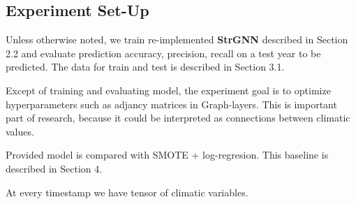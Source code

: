 \documentclass{article}
\begin{document}
\subsection{Experiment Set-Up}
Unless otherwise noted, we train re-implemented \textbf{StrGNN} described in Section 2.2 and evaluate prediction accuracy, precision, recall on a test year to be predicted. The data for train and test is described in Section 3.1.

Except of training and evaluating model, the experiment goal is to optimize hyperparameters such as adjancy matrices in Graph-layers. This is important part of research, because it could be interpreted as connections between climatic values. 

Provided model is compared with SMOTE + log-regresion. This baseline is described in Section 4.

At every timestamp we have tensor of climatic variables.   
\begin{figure}[h]
\begin{minipage}[h]{0.49\linewidth}
\end{minipage}
\hfill
\begin{minipage}[h]{0.49\linewidth}
\end{minipage}
\end{figure}
\end{document}
